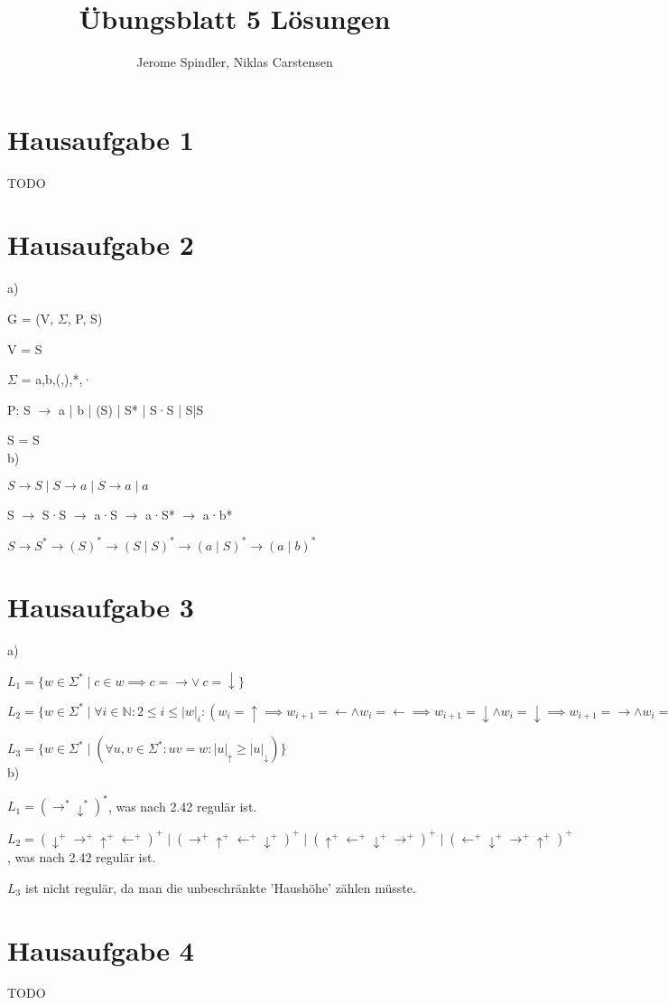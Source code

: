\documentclass{article}
\title{Übungsblatt 5 Lösungen}
\author{Jerome Spindler, Niklas Carstensen}
\begin{document}
\maketitle

\section{Hausaufgabe 1}

TODO

\section{Hausaufgabe 2}

a)
 
G = (V, $\Sigma$, P, S) 

V = {S} 

$\Sigma$ = {a,b,(,),*,·} 

P:    S $\rightarrow$ a | b | (S) | S* | S·S | S|S 

S = S 
\\ 
b)

$S \rightarrow S \mid S \rightarrow a \mid S \rightarrow a \mid a$

S $\rightarrow$ S·S $\rightarrow$ a·S $\rightarrow$ a·S* 
$\rightarrow$ a·b*

$S \rightarrow S^* \rightarrow (S)^* \rightarrow (S \mid S)^* 
\rightarrow (a \mid S)^* \rightarrow (a \mid b)^*$

\section{Hausaufgabe 3}

a)

$L_{1} = \{w \in \Sigma^* \mid c \in w \implies 
c = \rightarrow \lor \: c = \downarrow \}$

$L_{2} = \{w \in \Sigma^* \mid \forall i \in 
\mathbb{N} : 2 \leq i \leq \left| w \right|_i : 
(w_i = \uparrow \implies w_{i+1} = \leftarrow \land
w_i = \leftarrow \implies w_{i+1} = \downarrow \land
w_i = \downarrow \implies w_{i+1} = \rightarrow \land
w_i = \rightarrow \implies w_{i+1} = \uparrow \land )\}$

$L_{3} = \{w \in \Sigma^* \mid (\forall u,v \in \Sigma^* :
uv = w : \left| u \right|_\uparrow \geq \left| u \right|_\downarrow) \}$
\\
b)

$L_{1} = (\rightarrow^* \downarrow^*)^* $, was nach 2.42 regulär ist.

$L_{2} = (\downarrow^+\rightarrow^+\uparrow^+\leftarrow^+)^+ 
\mid (\rightarrow^+\uparrow^+\leftarrow^+\downarrow^+)^+
\mid (\uparrow^+\leftarrow^+\downarrow^+\rightarrow^+)^+
\mid (\leftarrow^+\downarrow^+\rightarrow^+\uparrow^+)^+ $, 
was nach 2.42 regulär ist.

$L_{3}$ ist nicht regulär, da man die unbeschränkte 'Haushöhe'
zählen müsste.

\section{Hausaufgabe 4}

TODO
\end{document}
